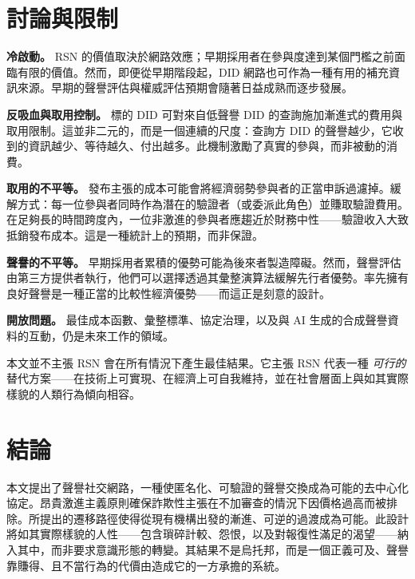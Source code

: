 \documentclass[11pt,a4paper,twocolumn]{article}
\begin{document}
\section{討論與限制}

\textbf{冷啟動。} RSN 的價值取決於網路效應；早期採用者在參與度達到某個門檻之前面臨有限的價值。然而，即便從早期階段起，DID 網路也可作為一種有用的補充資訊來源。早期的聲譽評估與權威評估預期會隨著日益成熟而逐步發展。

\textbf{反吸血與取用控制。} 標的 DID 可對來自低聲譽 DID 的查詢施加漸進式的費用與取用限制。這並非二元的，而是一個連續的尺度：查詢方 DID 的聲譽越少，它收到的資訊越少、等待越久、付出越多。此機制激勵了真實的參與，而非被動的消費。

\textbf{取用的不平等。} 發布主張的成本可能會將經濟弱勢參與者的正當申訴過濾掉。緩解方式：每一位參與者同時作為潛在的驗證者（或委派此角色）並賺取驗證費用。在足夠長的時間跨度內，一位非激進的參與者應趨近於財務中性——驗證收入大致抵銷發布成本。這是一種統計上的預期，而非保證。

\textbf{聲譽的不平等。} 早期採用者累積的優勢可能為後來者製造障礙。然而，聲譽評估由第三方提供者執行，他們可以選擇透過其彙整演算法緩解先行者優勢。率先擁有良好聲譽是一種正當的比較性經濟優勢——而這正是刻意的設計。

\textbf{開放問題。} 最佳成本函數、彙整標準、協定治理，以及與 AI 生成的合成聲譽資料的互動，仍是未來工作的領域。

本文並不主張 RSN 會在所有情況下產生最佳結果。它主張 RSN 代表一種 \emph{可行的} 替代方案——在技術上可實現、在經濟上可自我維持，並在社會層面上與如其實際樣貌的人類行為傾向相容。

\section{結論}

本文提出了聲譽社交網路，一種使匿名化、可驗證的聲譽交換成為可能的去中心化協定。昂貴激進主義原則確保詐欺性主張在不加審查的情況下因價格過高而被排除。所提出的遷移路徑使得從現有機構出發的漸進、可逆的過渡成為可能。此設計將如其實際樣貌的人性——包含瑣碎計較、怨恨，以及對報復性滿足的渴望——納入其中，而非要求意識形態的轉變。其結果不是烏托邦，而是一個正義可及、聲譽靠賺得、且不當行為的代價由造成它的一方承擔的系統。


\end{document}
